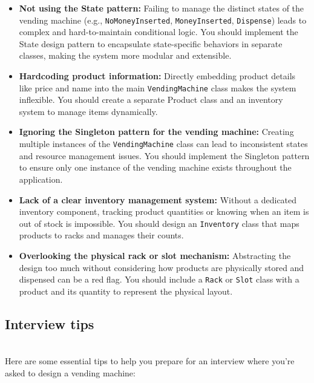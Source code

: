 \begin{itemize}
\item
\protect{}\label{TTQG0Fu7eOxj5VvGzGEXe}
\textbf{Not using the State pattern:} Failing to manage the distinct states of the vending machine (e.g., \texttt{NoMoneyInserted}, \texttt{MoneyInserted}, \texttt{Dispense}) leads to complex and hard-to-maintain conditional logic. You should implement the State design pattern to encapsulate state-specific behaviors in separate classes, making the system more modular and extensible.
\item
\protect{}\label{dFsiMG3Kw_2Y8wUX9EAXk}
\textbf{Hardcoding product information:} Directly embedding product details like price and name into the main \texttt{VendingMachine} class makes the system inflexible. You should create a separate Product class and an inventory system to manage items dynamically.
\item
\protect{}\label{Eu_8rI8_ta2h3XZNXd6R7}
\textbf{Ignoring the Singleton pattern for the vending machine:} Creating multiple instances of the \texttt{VendingMachine} class can lead to inconsistent states and resource management issues. You should implement the Singleton pattern to ensure only one instance of the vending machine exists throughout the application.
\item
\protect{}\label{bZ8YgJ9LXa1xFu_9c5cKk}
\textbf{Lack of a clear inventory management system:} Without a dedicated inventory component, tracking product quantities or knowing when an item is out of stock is impossible. You should design an \texttt{Inventory} class that maps products to racks and manages their counts.
\item
\protect{}\label{zM8A7DBQw3NLn4xD6o_iY}
\textbf{Overlooking the physical rack or slot mechanism:} Abstracting the design too much without considering how products are physically stored and dispensed can be a red flag. You should include a \texttt{Rack} or \texttt{Slot} class with a product and its quantity to represent the physical layout.
\end{itemize}

\subsection{Interview tips}\label{eSNaN6RVAUASP5jyl2v1R}
\\
Here are some essential tips to help you prepare for an interview where you're asked to design a vending machine:

